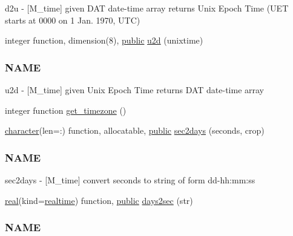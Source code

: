 \begin{DoxyCompactItemize}
\begin{DoxyCompactList}
d2u -\/ \mbox{[}M\+\_\+time\mbox{]} given D\+AT date-\/time array returns Unix Epoch Time (U\+ET starts at 0000 on 1 Jan. 1970, U\+TC) \end{DoxyCompactList}\item 
integer function, dimension(8), \hyperlink{M__stopwatch_83_8txt_a2f74811300c361e53b430611a7d1769f}{public} \hyperlink{namespacem__time_a083bc231f8ba1879d7f86ab424e77d6c}{u2d} (unixtime)
\begin{DoxyCompactList}\small\item\em \subsubsection*{N\+A\+ME}

u2d -\/ \mbox{[}M\+\_\+time\mbox{]} given Unix Epoch Time returns D\+AT date-\/time array \end{DoxyCompactList}\item 
integer function \hyperlink{namespacem__time_a7903410a1d28bcdf3d33ab0c2d74b124}{get\+\_\+timezone} ()
\item 
\hyperlink{option__stopwatch_83_8txt_abd4b21fbbd175834027b5224bfe97e66}{character}(len=\+:) function, allocatable, \hyperlink{M__stopwatch_83_8txt_a2f74811300c361e53b430611a7d1769f}{public} \hyperlink{namespacem__time_a7788285d79b8d58323b05e9a30a2d992}{sec2days} (seconds, crop)
\begin{DoxyCompactList}\small\item\em \subsubsection*{N\+A\+ME}

sec2days -\/ \mbox{[}M\+\_\+time\mbox{]} convert seconds to string of form dd-\/hh\+:mm\+:ss \end{DoxyCompactList}\item 
\hyperlink{read__watch_83_8txt_abdb62bde002f38ef75f810d3a905a823}{real}(kind=\hyperlink{namespacem__time_ac10ea9e8d59ec74eaa7d89f2517d7422}{realtime}) function, \hyperlink{M__stopwatch_83_8txt_a2f74811300c361e53b430611a7d1769f}{public} \hyperlink{namespacem__time_a99393c7906f1989f90ece03969224938}{days2sec} (str)
\begin{DoxyCompactList}\small\item\em \subsubsection*{N\+A\+ME}


\end{DoxyCompactList}
\end{DoxyCompactItemize}
